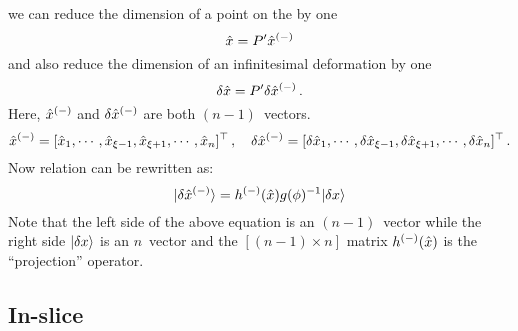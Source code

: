 we can reduce the dimension of a
point on the {\slice} by one
\[
  \hat{x}=P'\hat{x}^{(-)}
\]
and also reduce the dimension of an infinitesimal deformation by one
\[
  \delta \hat{x}=P'\delta \hat{x}^{(-)}
  \,.
\]
Here, $\hat{x}^{(-)}$ and
$\delta \hat{x}^{(-)}$ are both $(n-1)$\dmn\ vectors.
\[
  \hat{x}^{(-)}={[\hat{x}_1, \cdots, \hat{x}_{\xi-1}, \hat{x}_{\xi+1}, \cdots, \hat{x}_{n}]}{}^\top
  \,, \quad
  \delta \hat{x}^{(-)}= {[\delta \hat{x}_1, \cdots, \delta \hat{x}_{\xi-1},
    \delta \hat{x}_{\xi+1}, \cdots, \delta \hat{x}_{n}]}{}^\top
  \,.
\]
Now relation  can be rewritten as:
\begin{equation}
  \label{eq:projectionReduced}
  \ket{\delta \sspRedM} = \pMatM(\sspRed)\LieEl(\gSpace)^{-1}\ket{\delta \ssp}
\end{equation}
Note that the left side of the above equation
is an $(n-1)$\dmn\ vector while the right side $\ket{\delta \ssp}$
is an $n$\dmn\ vector and the $[(n-1)\times n]$ matrix $h^{(-)}(\hat{x})$
is the ``projection'' operator.

\subsection{In-slice \JacobianM }
\label{sect:sliceJac}

